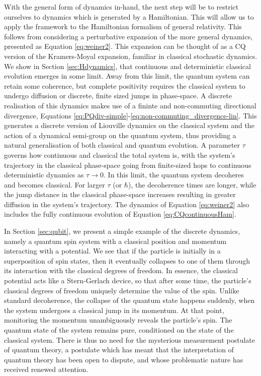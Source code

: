 \documentclass[aps,pra,showpacs,citeautoscript,amsmath,amssymb,floatfix,superscriptaddress,bbm, verbatim,amsfonts,changes,12pt,nofootinbib,longbibliography]{revtex4-2}
\begin{document}
With the general form of dynamics in-hand, the next step will be to restrict ourselves to dynamics which is generated by a Hamiltonian. This will allow us to apply the framework to the Hamiltonian formalism of general relativity. %
This follows from considering a perturbative expansion of the more general dynamics, presented as Equation \eqref{eq:weiner2}.  This expansion can be thought of as a CQ version of the Kramers-Moyal expansion\cite{kramers1940brownian,moyal1949stochastic}, familiar in classical stochastic dynamics.
We show in Section \ref{sec:Hdynamics}, that continuous and deterministic classical evolution emerges in some limit. 
Away from this limit, the quantum system can retain some coherence, but complete positivity requires the classical system to undergo diffusion or discrete, finite sized jumps in phase-space. 
A discrete realisation of this dynamics makes use of a fininte and non-commuting directional divergence, Equations \eqref{eq:PQdiv-simple}-\eqref{eq:non-commuting_divergence-lin}. This generates 
a discrete version of Liouville dynamics on the classical system and the action of a dynamical semi-group on the quantum system, thus providing a natural generalisation of both classical and quantum evolution. 
A parameter $\tau$ governs how continuous and classical the total system is, with the system's trajectory in the classical phase-space going from finite-sized hops to continuous deterministic dynamics as $\tau\rightarrow 0$. In this limit, the quantum system decoheres and becomes classical. For larger $\tau$ (or $\hbar$), the decoherence times are longer, while the jump distance in the classical phase-space increases resulting in greater diffusion in the system's trajectory. The dynamics of Equation \eqref{eq:weiner2} also includes the fully continuous evolution of Equation \eqref{eq:CQcontinuousHam}.

In Section \ref{sec:qubit}, we present a simple example of the discrete dynamics, namely a quantum spin system with a classical position and momentum interacting with a potential. We see that if the particle is initially in a superposition of spin states, then it eventually collapses to one of them through its interaction with the classical degrees of freedom. In essence, the classical potential acts like  a Stern-Gerlach device, so that after some time, the particle's classical degrees of freedom uniquely determine the value of the spin. Unlike standard decoherence, the collapse of the quantum state happens suddenly, when the system undergoes a classical jump in its momentum. At that point, monitoring the momentum unambiguously reveals the particle's spin. The quantum state of the system remains pure, conditioned on the state of the classical system. There is thus no need for the mysterious measurement postulate of quantum theory, a postulate which has meant that the interpretation of quantum theory has been open to dispute, and whose problematic nature has  received renewed attention\cite{frauchiger2016single}.
\end{document}
